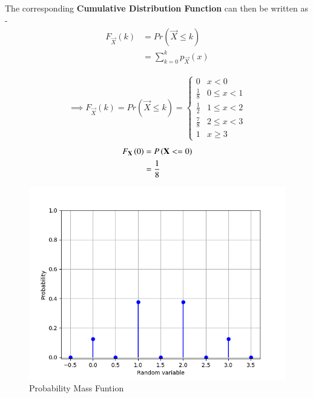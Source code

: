 \documentclass[journal]{IEEEtran}
\begin{document}
The corresponding \textbf{Cumulative Distribution Function} can then be written as - 
\begin{align}
	F_{\vec{X}}(k) &= Pr(\vec{X} \leq k) \\
		       &= \sum_{k=0}^{k} p_{\vec{X}} (x) 
\end{align}


\begin{align}
\implies F_{\vec{X}}(k) = Pr(\vec{X} \leq k) =
\begin{cases}
    0 & x < 0 \\
    \frac{1}{8} & 0 \leq x < 1 \\
    \frac{1}{2} & 1 \leq x < 2 \\
    \frac{7}{8} & 2 \leq x < 3 \\
    1 & x \geq 3
\end{cases}
\end{align}
\begin{align}
	F_{\mathbf{X}} \left(0\right) &= P \left( \mathbf{X} <= 0 \right) \\
	                     &= \frac{1}{8}
\end{align}
\begin{figure}[h]
\centering
\includegraphics[width=\columnwidth]{figs/fig1.png}
\caption{Probability Mass Funtion}
\label{fig:Plot1} 
\end{figure}
\end{document}
